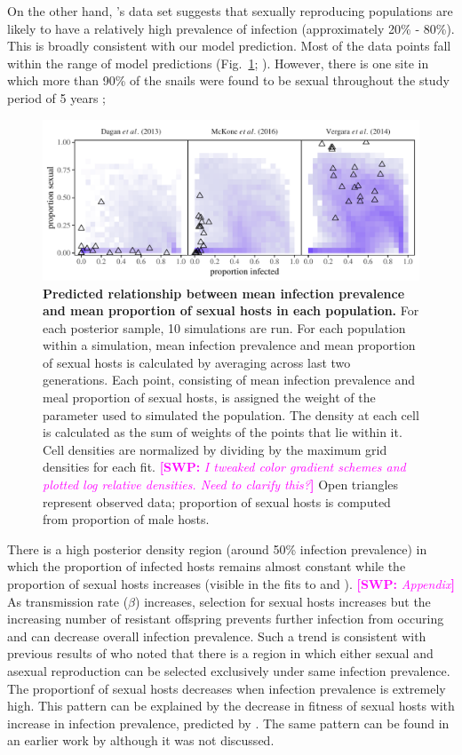 \documentclass{article}\usepackage[]{graphicx}\usepackage[]{color}
\newcommand{\comment}[3]{\textcolor{#1}{\textbf{[#2: }\textit{#3}\textbf{]}}}
\newcommand{\swp}[1]{\comment{magenta}{SWP}{#1}}
\newcommand{\citetapos}[1]{\citeauthor{#1}'s \citeyearpar{#1}}
\newcommand{\fref}[1]{Fig.~\ref{fig:#1}}
\begin{document}
On the other hand, \citetapos{vergara2014infection} data set suggests that sexually reproducing populations are likely to have a relatively high prevalence of infection (approximately 20\% - 80\%).
This is broadly consistent with our model prediction. 
Most of the data points fall within the range of model predictions (\fref{ivs}; \cite{vergara2014infection}).
However, there is one site in which more than 90\% of the snails were found to be sexual throughout the study period of 5 years \citep{vergara2014infection};

\begin{figure}[!ht]
\includegraphics[width=\textwidth]{../fig/simulated_data2.pdf}
\caption{{\bf Predicted relationship between mean infection prevalence and mean proportion of sexual hosts in each population.}
For each posterior sample, 10 simulations are run.
For each population within a simulation, mean infection prevalence and mean proportion of sexual hosts is calculated by averaging across last two generations. 
Each point, consisting of mean infection prevalence and meal proportion of sexual hosts, is assigned the weight of the parameter used to simulated the population.
The density at each cell is calculated as the sum of weights of the points that lie within it.
Cell densities are normalized by dividing by the maximum grid densities for each fit.
\swp{I tweaked color gradient schemes and plotted log relative densities. Need to clarify this?}
Open triangles represent observed data; proportion of sexual hosts is computed from proportion of male hosts.
}
\label{fig:ivs}
\end{figure}

There is a high posterior density region (around 50\% infection prevalence) in which the proportion of infected hosts remains almost constant while the proportion of sexual hosts increases (visible in the fits to \cite{mckone2016fine} and \cite{vergara2014infection}). \swp{Appendix}
As transmission rate ($\beta$) increases, selection for sexual hosts increases but the increasing number of resistant offspring prevents further infection from occuring and can decrease overall infection prevalence.
Such a trend is consistent with previous results of \cite{lively2001trematode} who noted that there is a region in which either sexual and asexual reproduction can be selected exclusively under same infection prevalence.
The proportionf of sexual hosts decreases when infection prevalence is extremely high.
This pattern can be explained by the decrease in fitness of sexual hosts with increase in infection prevalence, predicted by \cite{ashby2015diversity}. 
The same pattern can be found in an earlier work by \cite{lively2010epidemiological} although it was not discussed.
\end{document}
